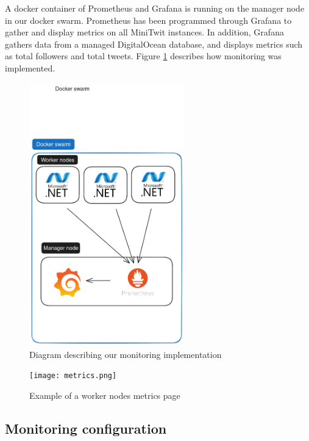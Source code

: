 A docker container of Prometheus and Grafana is running on the manager node in our docker swarm.
Prometheus has been programmed through Grafana to gather and display metrics on all MiniTwit instances. %
In addition, Grafana gathers data from a managed DigitalOcean database, and displays metrics such as total followers and total tweets.
Figure \ref{fig:Monitoring2} describes how monitoring was implemented.

\begin{figure}[H]
	\centering
	\includegraphics[width=0.6\textwidth]{Monitoring2.png}
	\caption{Diagram describing our monitoring implementation}
	\label{fig:Monitoring2}
\end{figure}
\begin{figure}[H]
	\centering
	\texttt{[image: metrics.png]}
	\caption{Example of a worker nodes metrics page}
	\label{fig:metrics}
\end{figure}

\subsection{Monitoring configuration}

